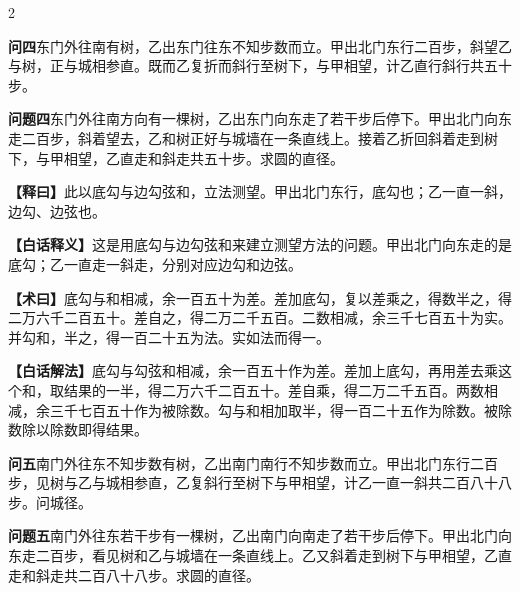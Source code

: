 \documentclass[11pt,a4paper]{article}
\newcommand{\WenQuestion}[1]{\textbf{\textcolor{classicalcolor}{#1}}}
\newcommand{\BaiQuestion}[1]{\textbf{\textcolor{moderncolor}{#1}}}
\newcommand{\WenExplain}{\textcolor{classicalcolor}{\textbf{【释曰】}}}
\newcommand{\BaiExplain}{\textcolor{moderncolor}{\textbf{【白话释义】}}}
\newcommand{\WenMethod}{\textcolor{classicalcolor}{\textbf{【术曰】}}}
\newcommand{\BaiMethod}{\textcolor{moderncolor}{\textbf{【白话解法】}}}
\begin{document}
\begin{paracol}{2}

\switchcolumn*
\begin{tcolorbox}[colback=red!3,colframe=red!30!black,boxrule=0.3pt]
\WenQuestion{问四}\quad 东门外往南有树，乙出东门往东不知步数而立。甲出北门东行二百步，斜望乙与树，正与城相参直。既而乙复折而斜行至树下，与甲相望，计乙直行斜行共五十步。
\end{tcolorbox}
\switchcolumn
\begin{tcolorbox}[colback=blue!3,colframe=blue!30!black,boxrule=0.3pt]
\BaiQuestion{问题四}\quad 东门外往南方向有一棵树，乙出东门向东走了若干步后停下。甲出北门向东走二百步，斜着望去，乙和树正好与城墙在一条直线上。接着乙折回斜着走到树下，与甲相望，乙直走和斜走共五十步。求圆的直径。
\end{tcolorbox}

\switchcolumn*
\begin{tcolorbox}[colback=red!5,colframe=red!30!black,boxrule=0.3pt]
\WenExplain\quad 此以底勾与边勾弦和，立法测望。甲出北门东行，底勾也；乙一直一斜，边勾、边弦也。
\end{tcolorbox}
\switchcolumn
\begin{tcolorbox}[colback=blue!5,colframe=blue!30!black,boxrule=0.3pt]
\BaiExplain\quad 这是用底勾与边勾弦和来建立测望方法的问题。甲出北门向东走的是底勾；乙一直走一斜走，分别对应边勾和边弦。
\end{tcolorbox}

\switchcolumn*
\begin{tcolorbox}[colback=red!5,colframe=red!40!black,boxrule=0.3pt]
\WenMethod\quad 底勾与和相减，余一百五十为差。差加底勾，复以差乘之，得数半之，得二万六千二百五十。差自之，得二万二千五百。二数相减，余三千七百五十为实。并勾和，半之，得一百二十五为法。实如法而得一。
\end{tcolorbox}
\switchcolumn
\begin{tcolorbox}[colback=blue!5,colframe=blue!40!black,boxrule=0.3pt]
\BaiMethod\quad 底勾与勾弦和相减，余一百五十作为差。差加上底勾，再用差去乘这个和，取结果的一半，得二万六千二百五十。差自乘，得二万二千五百。两数相减，余三千七百五十作为被除数。勾与和相加取半，得一百二十五作为除数。被除数除以除数即得结果。
\end{tcolorbox}

\vspace{0.8em}

\switchcolumn*
\begin{tcolorbox}[colback=red!3,colframe=red!30!black,boxrule=0.3pt]
\WenQuestion{问五}\quad 南门外往东不知步数有树，乙出南门南行不知步数而立。甲出北门东行二百步，见树与乙与城相参直，乙复斜行至树下与甲相望，计乙一直一斜共二百八十八步。问城径。
\end{tcolorbox}
\switchcolumn
\begin{tcolorbox}[colback=blue!3,colframe=blue!30!black,boxrule=0.3pt]
\BaiQuestion{问题五}\quad 南门外往东若干步有一棵树，乙出南门向南走了若干步后停下。甲出北门向东走二百步，看见树和乙与城墙在一条直线上。乙又斜着走到树下与甲相望，乙直走和斜走共二百八十八步。求圆的直径。
\end{tcolorbox}


\end{paracol}
\end{document}

